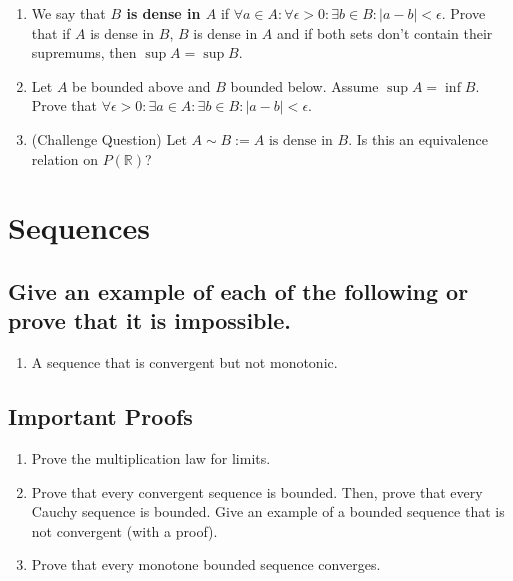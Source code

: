 \documentclass{article}
\theoremstyle{definition}
\newcommand{\R}{\mathbb{R}}
\begin{document}
\begin{enumerate}
    \item We say that \textbf{$B$ is dense in $A$} if $\forall a \in A: \forall \epsilon > 0: \exists b \in B: \lvert a - b \rvert < \epsilon$.
    Prove that if $A$ is dense in $B$, $B$ is dense in $A$ and if both sets don't contain their supremums, then $\sup A = \sup B$.

    \item Let $A$ be bounded above and $B$ bounded below. Assume $\sup A = \inf B$. Prove that $\forall \epsilon > 0: \exists a \in A:
    \exists b \in B: \lvert a - b \rvert < \epsilon$.

    
    
    \item (Challenge Question) Let $A \sim B := \text{$A$ is dense in $B$}$. Is this an equivalence relation on $P(\R)$?
\end{enumerate}

\newpage

\section{Sequences}

\subsection{Give an example of each of the following or prove that it is impossible.}

\begin{enumerate}
    \item A sequence that is convergent but not monotonic.
\end{enumerate}

\subsection{Important Proofs}
\begin{enumerate}
    \item Prove the multiplication law for limits.
    
    \item Prove that every convergent sequence is bounded. Then, prove that every Cauchy sequence is bounded. Give an example of a bounded sequence that is not convergent (with a proof).
   
    \item Prove that every monotone bounded sequence converges.
    
\end{enumerate}
\end{document}
